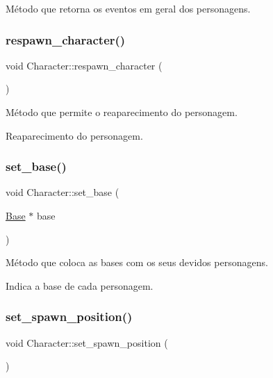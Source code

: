 Método que retorna os eventos em geral dos personagens. \mbox{\label{classCharacter_afc90256ef2253670aee9def34f700247}} 
\subsubsection{\texorpdfstring{respawn\+\_\+character()}{respawn\_character()}}
{\footnotesize\ttfamily void Character\+::respawn\+\_\+character (\begin{DoxyParamCaption}{ }\end{DoxyParamCaption})\hspace{0.3cm}{\ttfamily [protected]}}



Método que permite o reaparecimento do personagem. 

Reaparecimento do personagem. \mbox{\label{classCharacter_a4cb413b53515a09d025fa0b3fe5a4e9f}} 
\subsubsection{\texorpdfstring{set\+\_\+base()}{set\_base()}}
{\footnotesize\ttfamily void Character\+::set\+\_\+base (\begin{DoxyParamCaption}\item[{\mbox{\hyperlink{classBase}{Base}} $\ast$}]{base }\end{DoxyParamCaption})}



Método que coloca as bases com os seus devidos personagens. 

Indica a base de cada personagem. \mbox{\label{classCharacter_a75f825ad6509fa1601d2e2bc2ac04b3c}} 
\subsubsection{\texorpdfstring{set\+\_\+spawn\+\_\+position()}{set\_spawn\_position()}}
{\footnotesize\ttfamily void Character\+::set\+\_\+spawn\+\_\+position (\begin{DoxyParamCaption}{ }\end{DoxyParamCaption})\hspace{0.3cm}{\ttfamily [protected]}}



